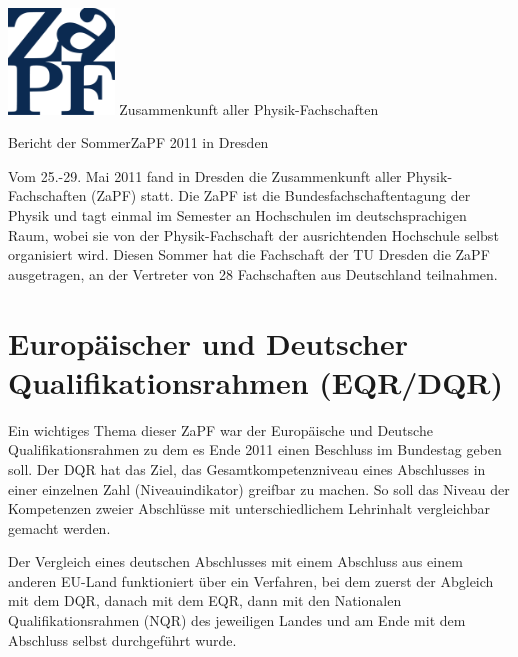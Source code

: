 \documentclass{scrartcl}
\begin{document}
\hspace{0.87\textwidth}
\begin{minipage}{120pt}
\vspace{-1.8cm}
\includegraphics[width=80pt]{logo.pdf}
\centering
\small Zusammenkunft aller Physik-Fachschaften
\end{minipage}

\begin{center}
\vspace{1.5cm}
\huge{Bericht der SommerZaPF 2011 in Dresden} 
\vspace{1cm}
\end{center}

Vom 25.-29. Mai 2011 fand in Dresden die Zusammenkunft aller Physik-Fachschaften (ZaPF) statt. Die ZaPF ist die
Bundesfachschaftentagung der Physik und tagt einmal im Semester an Hochschulen im deutschsprachigen Raum, wobei sie von
der Physik-Fachschaft der ausrichtenden Hochschule selbst organisiert wird. Diesen Sommer hat die Fachschaft der TU
Dresden die ZaPF ausgetragen, an der Vertreter von 28 Fachschaften aus Deutschland teilnahmen.


\section*{Europäischer und Deutscher Qualifikationsrahmen (EQR/DQR)}
\vspace{-12pt}
Ein wichtiges Thema dieser ZaPF war der Europäische und Deutsche Qualifikationsrahmen zu dem es Ende 2011 einen
Beschluss im Bundestag geben soll. Der DQR hat das Ziel, das Gesamtkompetenzniveau eines Abschlusses in einer
einzelnen Zahl (Niveauindikator) greifbar zu machen. So soll das Niveau der Kompetenzen zweier Abschlüsse
mit unterschiedlichem Lehrinhalt vergleichbar gemacht werden.

Der Vergleich eines deutschen Abschlusses mit einem
Abschluss aus einem anderen EU-Land funktioniert über ein Verfahren, bei dem zuerst der Abgleich mit dem DQR, danach
mit dem EQR, dann mit den Nationalen Qualifikationsrahmen (NQR) des jeweiligen Landes und am Ende mit dem Abschluss 
selbst durchgeführt wurde.
\end{document}
